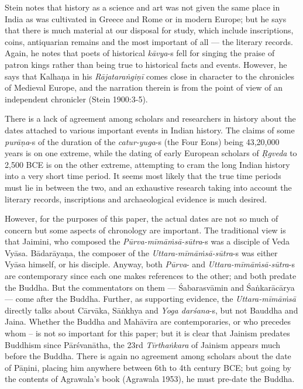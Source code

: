 Stein notes that history as a science and art was not given the same place in India as was cultivated in Greece and Rome or in modern Europe; but he says that there is much material at our disposal for study, which include inscriptions, coins, antiquarian remains and the most important of all — the literary records. Again, he notes that poets of historical \textit{kāvya}-s fell for singing the praise of patron kings rather than being true to historical facts and events. However, he says that Kalhaṇa in his \textit{Rājataraṅgiṇī} comes close in character to the chronicles of Medieval Europe, and the narration therein is from the point of view of an independent chronicler (Stein 1900:3-5).

There is a lack of agreement among scholars and researchers in history about the dates attached to various important events in Indian history. The claims of some \textit{purāṇa}-s of the duration of the \textit{catur-yuga}-s (the Four Eons) being 43,20,000 years is on one extreme, while the dating of early European scholars of \textit{Ṛgveda} to 2,500 BCE is on the other extreme, attempting to cram the long Indian history into a very short time period. It seems most likely that the true time periods must lie in between the two, and an exhaustive research taking into account the literary records, inscriptions and archaeological evidence is much desired.

However, for the purposes of this paper, the actual dates are not so much of concern but some aspects of chronology are important. The traditional view is that Jaimini, who composed the \textit{Pūrva-mīmāṁsā-sūtra}-s was a disciple of Veda Vyāsa. Bādarāyaṇa, the composer of the \textit{Uttara-mīmāṁsā-sūtra}-s was either Vyāsa himself, or his disciple. Anyway, both \textit{Pūrva}- and \textit{Uttara-mīmāṁsā-sūtra}-s are contemporary since each one makes references to the other; and both predate the Buddha. But the commentators on them — Śabarasvāmin and Śaṅkarācārya — come after the Buddha. Further, as supporting evidence, the \textit{Uttara-mīmāṁsā} directly talks about Cārvāka, Sāṅkhya and \textit{Yoga darśana}-s, but not Bauddha and Jaina. Whether the Buddha and Mahāvīra are contemporaries, or who precedes whom – is not so important for this paper; but it is clear that Jainism predates Buddhism since Pārśvanātha, the 23rd \textit{Tīrthaṅkara} of Jainism appears much before the Buddha. There is again no agreement among scholars about the date of Pāṇini, placing him anywhere between 6th to 4th century BCE; but going by the contents of Agrawala’s book (Agrawala 1953), he must pre-date the Buddha.


